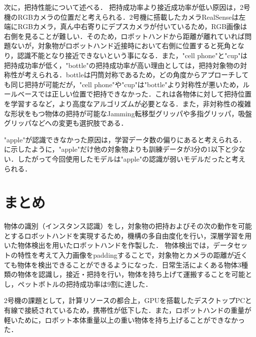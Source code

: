 次に，把持性能について述べる．
把持成功率より接近成功率が低い原因は，2号機のRGBカメラの位置だと考えられる．2号機に搭載したカメラRealSenseは左端にRGBカメラ，真ん中右寄りにデプスカメラが付いているため，RGB画像は右側を見ることが難しい．そのため，ロボットハンドから距離が離れていれば問題ないが，対象物がロボットハンド近接時において右側に位置すると死角となり，認識不能となり接近できないという事になる．また，"cell phone"と"cup"は把持成功率が低く，"bottle"の把持成功率が高い理由としては，把持対象物の対称性が考えられる．bottleは円筒対称であるため，どの角度からアプローチしても同じ把持が可能だが，"cell phone"や"cup"は"bottle"より対称性が悪いため，ルールベースでは正しい位置で把持できなかった．これは各物体に対して把持位置を学習するなど，より高度なアルゴリズムが必要となる．また，非対称性の複雑な形状をもつ物体の把持が可能なJamming転移型グリッパ\cite{jamminggripper}や多指グリッパ，吸盤グリッパなどへの変更も選択肢である．

"apple"が認識できなかった原因は，学習データ数の偏りにあると考えられる．に示したように，"apple"だけ他の対象物よりも訓練データが3分の1以下と少ない．したがって今回使用したモデルは"apple"の認識が弱いモデルだったと考えられる．


\section{まとめ}
物体の識別（インスタンス認識）をし，対象物の把持およびその次の動作を可能とするロボットハンドを実現するため，機構の多自由度化を行い，深層学習を用いた物体検出を用いたロボットハンドを作製した．
物体検出では，データセットの特性を考えて入力画像をpaddingすることで，対象物とカメラの距離が近くても物体を検出できることができるようになった．日常生活によくある物体3種類の物体を認識し，接近・把持を行い，物体を持ち上げて運搬することを可能とし，ペットボトルの把持成功率は9割に達した．

2号機の課題として，計算リソースの都合上，GPUを搭載したデスクトップPCと有線で接続されているため，携帯性が低下した．また，ロボットハンドの重量が軽いために，ロボット本体重量以上の重い物体を持ち上げることができなかった．